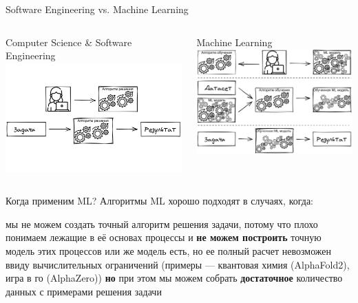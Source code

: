 \documentclass[aspectratio=169, professionalfonts]{beamer}
\begin{document}
\begin{frame}{Software Engineering vs. Machine Learning}
    \begin{columns}[T]
        \begin{column}{.49\linewidth}
            \centering
            Computer Science \& Software Engineering
            \includegraphics[width=\linewidth]{figures/fig40-swe-approach.jpg}
        \end{column}
        \pause
        \begin{column}{.49\linewidth}
            \centering
            Machine Learning
            \includegraphics[width=\linewidth]{figures/fig41-ml-approach.jpg}
        \end{column}
    \end{columns}
\end{frame}

\begin{frame}{Когда применим ML?}
    Алгоритмы ML хорошо подходят в случаях, когда:
    \begin{outline}
        \1 мы не можем создать точный алгоритм решения задачи, потому что плохо понимаем
        лежащие в её основах процессы и \textbf{не можем построить} точную модель этих процессов
        \pause
        \1 или же модель есть, но ее полный расчет невозможен ввиду вычислительных
        ограничений (примеры --- квантовая химия (AlphaFold2), игра в го (AlphaZero))
        \pause
        \1 \textbf{но} при этом мы можем собрать \textbf{достаточное} количество данных с примерами
        решения задачи
    \end{outline}
\end{frame}
\end{document}
